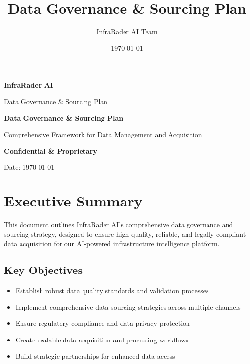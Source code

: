 \documentclass[business]{../templates/infraradar-main}
\title{Data Governance \& Sourcing Plan}
\author{InfraRader AI Team}
\date{\today}
\begin{document}
\begin{titlepage}
    \centering
    \vspace*{2cm}
    
    {\Huge\bfseries\color{infraradar@primary} InfraRader AI\par}
    \vspace{0.5cm}
    {\Large\color{infraradar@text} Data Governance \& Sourcing Plan\par}
    \vspace{2cm}
    
    {\huge\bfseries Data Governance \& Sourcing Plan\par}
    \vspace{1cm}
    
    {\large Comprehensive Framework for Data Management and Acquisition\par}
    \vspace{2cm}
    
    {\large\bfseries\color{infraradar@primary} Confidential \& Proprietary\par}
    {\large Date: \today\par}
    
\end{titlepage}

\tableofcontents
\newpage

\section{Executive Summary}

This document outlines InfraRader AI's comprehensive data governance and sourcing strategy, designed to ensure high-quality, reliable, and legally compliant data acquisition for our AI-powered infrastructure intelligence platform.

\subsection{Key Objectives}
\begin{itemize}
    \item Establish robust data quality standards and validation processes
    \item Implement comprehensive data sourcing strategies across multiple channels
    \item Ensure regulatory compliance and data privacy protection
    \item Create scalable data acquisition and processing workflows
    \item Build strategic partnerships for enhanced data access
\end{itemize}
\end{document}
